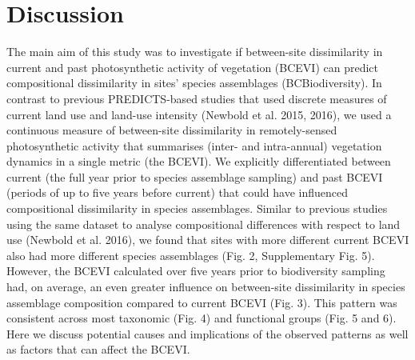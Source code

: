 {\section{Discussion}
The main aim of this study was to investigate if between-site dissimilarity in current and past photosynthetic activity of vegetation (BCEVI) can predict compositional dissimilarity in sites’ species assemblages (BCBiodiversity). In contrast to previous PREDICTS-based studies that used discrete measures of current land use and land-use intensity (Newbold et al. 2015, 2016), we used a continuous measure of between-site dissimilarity in remotely-sensed photosynthetic activity that summarises (inter- and intra-annual) vegetation dynamics in a single metric (the BCEVI). We explicitly differentiated between current (the full year prior to species assemblage sampling) and past BCEVI (periods of up to five years before current) that could have influenced compositional dissimilarity in species assemblages. Similar to previous studies using the same dataset to analyse compositional differences with respect to land use (Newbold et al. 2016), we found that sites with more different current BCEVI also had more different species assemblages (Fig. 2, Supplementary Fig. 5). However, the BCEVI calculated over five years prior to biodiversity sampling had, on average, an even greater influence on between-site dissimilarity in species assemblage composition compared to current BCEVI (Fig. 3). This pattern was consistent across most taxonomic (Fig. 4) and functional groups (Fig. 5 and 6). Here we discuss potential causes and implications of the observed patterns as well as factors that can affect the BCEVI.

}
